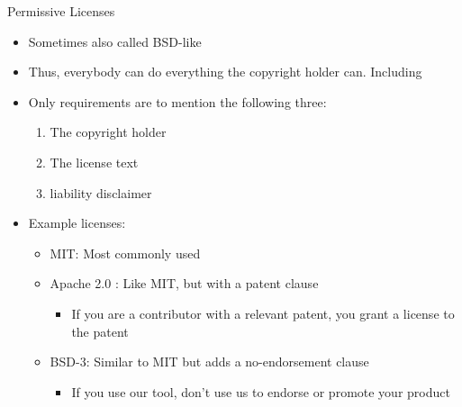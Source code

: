 \documentclass[compress,aspectratio=169]{beamer}
\begin{document}
  \begin{frame}{Permissive Licenses}
    \begin{itemize}
      \item Sometimes also called BSD-like \cite{guide}
      \item Thus, everybody can do everything the copyright holder can. Including
      \item Only requirements are to mention the following three:
        \begin{enumerate}
          \item The copyright holder
          \item The license text
          \item liability disclaimer
        \end{enumerate}
      \item Example licenses:
        \begin{itemize}
          \item MIT: Most commonly used
          \item Apache 2.0 \cite{apache2}: Like MIT, but with a patent clause \cite{apachefaq}
            \begin{itemize}
              \item If you are a contributor with a relevant patent, you grant a license to the patent
            \end{itemize}
          \item BSD-3: Similar to MIT but adds a no-endorsement clause
            \begin{itemize}
              \item If you use our tool, don't use us to endorse or promote your product
            \end{itemize}
        \end{itemize}
    \end{itemize}
  \end{frame}
\end{document}
